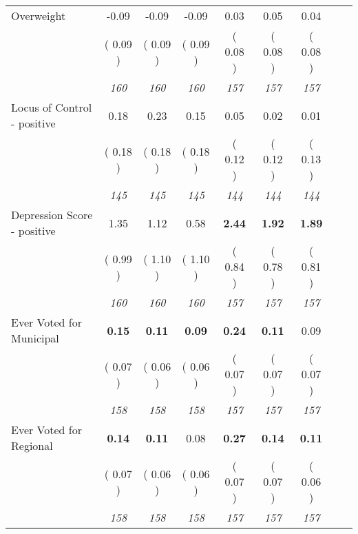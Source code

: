 \begin{tabular}{l c c c c c c c c}
Overweight &     -0.09 &     -0.09 &     -0.09 &      0.03 &      0.05 &      0.04 \\
& (     0.09 ) & (     0.09 ) & (     0.09 ) & (     0.08 ) & (     0.08 ) & (     0.08 ) \\
& \textit{ 160 } & \textit{ 160 } & \textit{ 160 } & \textit{ 157 } & \textit{ 157 } & \textit{ 157 } \\
Locus of Control - positive &      0.18 &      0.23 &      0.15 &      0.05 &      0.02 &      0.01 \\
& (     0.18 ) & (     0.18 ) & (     0.18 ) & (     0.12 ) & (     0.12 ) & (     0.13 ) \\
& \textit{ 145 } & \textit{ 145 } & \textit{ 145 } & \textit{ 144 } & \textit{ 144 } & \textit{ 144 } \\
Depression Score - positive &      1.35 &      1.12 &      0.58 & \textbf{      2.44 } & \textbf{      1.92 } & \textbf{      1.89 } \\
& (     0.99 ) & (     1.10 ) & (     1.10 ) & (     0.84 ) & (     0.78 ) & (     0.81 ) \\
& \textit{ 160 } & \textit{ 160 } & \textit{ 160 } & \textit{ 157 } & \textit{ 157 } & \textit{ 157 } \\
Ever Voted for Municipal & \textbf{      0.15 } & \textbf{      0.11 } & \textbf{      0.09 } & \textbf{      0.24 } & \textbf{      0.11 } &      0.09 \\
& (     0.07 ) & (     0.06 ) & (     0.06 ) & (     0.07 ) & (     0.07 ) & (     0.07 ) \\
& \textit{ 158 } & \textit{ 158 } & \textit{ 158 } & \textit{ 157 } & \textit{ 157 } & \textit{ 157 } \\
Ever Voted for Regional & \textbf{      0.14 } & \textbf{      0.11 } &      0.08 & \textbf{      0.27 } & \textbf{      0.14 } & \textbf{      0.11 } \\
& (     0.07 ) & (     0.06 ) & (     0.06 ) & (     0.07 ) & (     0.07 ) & (     0.06 ) \\
& \textit{ 158 } & \textit{ 158 } & \textit{ 158 } & \textit{ 157 } & \textit{ 157 } & \textit{ 157 } \\
\bottomrule
\end{tabular}
